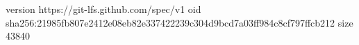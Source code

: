 version https://git-lfs.github.com/spec/v1
oid sha256:21985fb807e2412e08eb82e337422239c304d9bcd7a03ff984c8cf797ffcb212
size 43840
